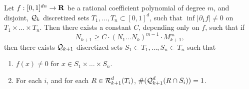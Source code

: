 \begin{theorem}
    Let $f: [0,1]^{dn} \to \operatorname{\mathbf{R}}$ be a rational coefficient polynomial of degree $m$, and disjoint, $\operatorname{\mathcal{Q}}_k$ discretized sets $T_1, \dots, T_n \subset [0,1]^d$, such that $\inf |\partial_1 f| \neq 0$ on $T_1 \times \dots \times T_n$. Then there exists a constant $C$, depending only on $f$, such that if
    \begin{equation} \label{equation124426034990370935} N_{k+1} \geq C \cdot (N_1 \dots N_k)^{m-1} \cdot M_{k+1}^m, \end{equation}
    then there exists $\operatorname{\mathcal{Q}}_{k+1}$ discretized sets $S_1 \subset T_1, \dots, S_n \subset T_n$ such that
    \begin{enumerate}
        \item $f(x) \neq 0$ for $x \in S_1 \times \dots \times S_n$.
        \item For each $i$, and for each $R \in \operatorname{\mathcal{R}}_{k+1}^d(T_i)$, $\#(\operatorname{\mathcal{Q}}_{k+1}^d(R \cap S_i)) = 1$.
    \end{enumerate}
\end{theorem}
